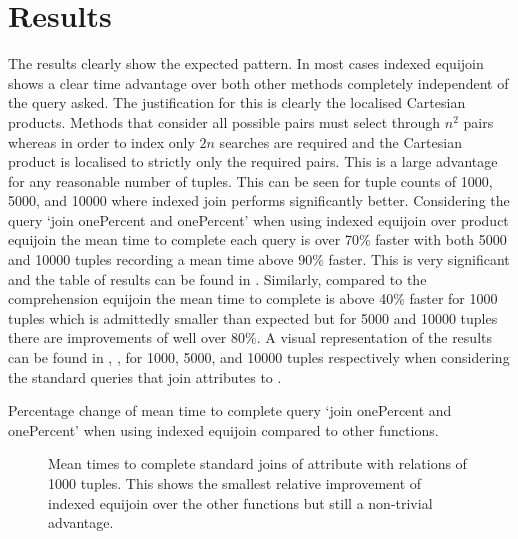 \section{Results}\label{sec:benchmark:results}
The results clearly show the expected pattern. In most cases indexed equijoin
shows a clear time advantage over both other methods completely independent of
the query asked. The justification for this is clearly the localised Cartesian
products. Methods that consider all possible pairs must select through $n^2$
pairs whereas in order to index only $2n$ searches are required and the
Cartesian product is localised to strictly only the required pairs. This is a
large advantage for any reasonable number of tuples. This can be seen for tuple
counts of 1000, 5000, and 10000 where indexed join performs significantly better.
Considering the query `join onePercent and onePercent' when using indexed
equijoin over product equijoin the mean time to complete each query is over 70\% faster
with both 5000 and 10000 tuples recording a mean time above 90\% faster. This
is very significant and the table of results can be found in
. Similarly, compared to the comprehension
equijoin the mean time to complete is above 40\% faster for 1000 tuples which is
admittedly smaller than expected but for 5000 and 10000 tuples there are
improvements of well over 80\%. A visual representation of the results can be
found in ,
,
 for 1000, 5000, and 10000 tuples
respectively when considering the standard queries that join attributes to
.

\begin{table}[p]
    \centering
    
    \caption{Percentage change of mean time to complete query `join onePercent
        and onePercent' when using indexed equijoin compared to other
    functions.}
    \label{tab:percentage-change-of-means-join-onePercent-and-onePercent}
\end{table}

\begin{figure}[p]
    
    \caption{Mean times to complete standard joins of
     attribute with relations of 1000 tuples. This
shows the smallest relative improvement of indexed equijoin over the other
functions but still a non-trivial advantage.}
    \label{fig:benchmark:onePercent-1000}
\end{figure}

